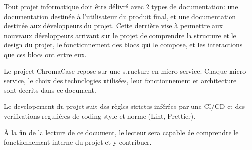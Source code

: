 Tout projet informatique doit être délivré avec 2 types de documentation: une documentation destinée à l’utilisateur du produit final, et une documentation destinée aux développeurs du projet. Cette dernière vise à permettre aux nouveaux développeurs arrivant sur le projet de comprendre la structure et le design du projet, le fonctionnement des blocs qui le compose, et les interactions que ces blocs ont entre eux.

Le project ChromaCase repose sur une structure en micro-service. Chaque micro-service, le choix des technologies utilisées, leur fonctionnement et architecture sont decrits dans ce document.

Le developement du projet suit des règles strictes inférées par une CI/CD et des verifications regulières de coding-style et norme (Lint, Prettier).

À la fin de la lecture de ce document, le lecteur sera capable de comprendre le fonctionnement interne du projet et y contribuer.